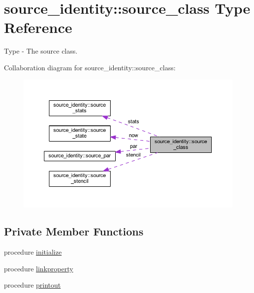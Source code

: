 \hypertarget{structsource__identity_1_1source__class}{}\section{source\+\_\+identity\+:\+:source\+\_\+class Type Reference}
\label{structsource__identity_1_1source__class}


Type -\/ The source class.  




Collaboration diagram for source\+\_\+identity\+:\+:source\+\_\+class\+:\nopagebreak
\begin{figure}[H]
\begin{center}
\leavevmode
\includegraphics[width=350pt]{structsource__identity_1_1source__class__coll__graph}
\end{center}
\end{figure}
\subsection*{Private Member Functions}
\begin{DoxyCompactItemize}
\item 
procedure \hyperlink{structsource__identity_1_1source__class_af232e5b647bcb16f34dcc2f797ef7a95}{initialize}
\item 
procedure \hyperlink{structsource__identity_1_1source__class_ad889c3a7ce279e199ecf059a50a73ca2}{linkproperty}
\item 
procedure \hyperlink{structsource__identity_1_1source__class_ac9866a62bf8838665bb929deff5bce24}{printout}
\end{DoxyCompactItemize}
